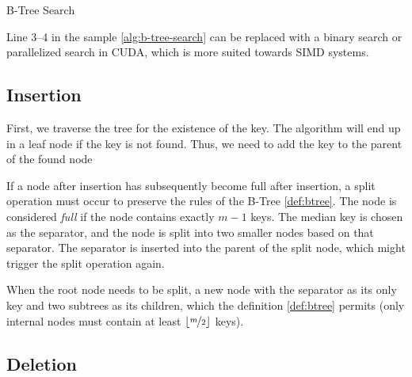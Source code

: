 \begin{algorithm}
  \caption{B-Tree Search}\label{alg:b-tree-search}
  \DontPrintSemicolon


\end{algorithm}

Line 3--4 in the sample \cref{alg:b-tree-search} can be replaced with a binary search or parallelized search in CUDA, which is more suited towards SIMD systems.

\subsection{Insertion}

First, we traverse the tree for the existence of the key. The algorithm will end up in a leaf node if the key is not found. Thus, we need to add the key to the parent of the found node

If a node after insertion has subsequently become full after insertion, a split operation must occur to preserve the rules of the B-Tree \cref{def:btree}. The node is considered \textit{full} if the node contains exactly $m - 1$ keys. The median key is chosen as the separator, and the node is split into two smaller nodes based on that separator. The separator is inserted into the parent of the split node, which might trigger the split operation again.

When the root node needs to be split, a new node with the separator as its only key and two subtrees as its children, which the definition \cref{def:btree} permits (only internal nodes must contain at least $\lfloor\nicefrac{m}{2}\rfloor$ keys).

\subsection{Deletion}

